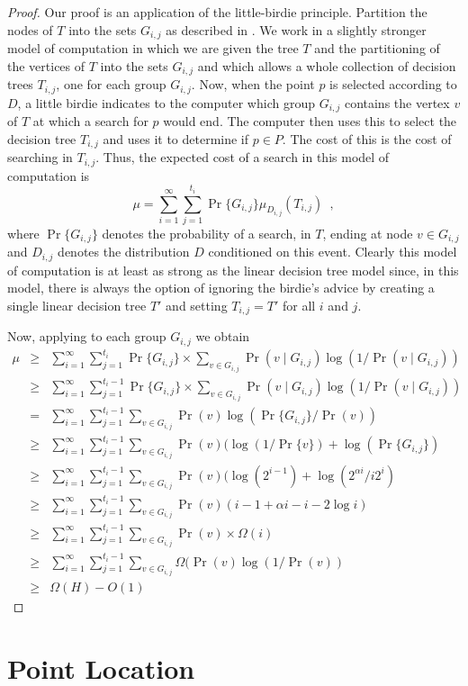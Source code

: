 \documentclass[charterfonts,lotsofwhite]{patmorin}
\begin{document}
\begin{proof}
Our proof is an application of the little-birdie principle.  Partition
the nodes of $T$ into the sets $G_{i,j}$ as described in
.  We work in a slightly stronger model of
computation in which we are given the tree $T$ and the partitioning of
the vertices of $T$ into the sets $G_{i,j}$ and which allows a whole
collection of decision trees $T_{i,j}$, one for each group $G_{i,j}$.
Now, when the point $p$ is selected according to $D$, a little birdie
indicates to the computer which group $G_{i,j}$ contains the vertex
$v$ of $T$ at which a search for $p$ would end.  The computer then
uses this to select the decision tree $T_{i,j}$ and uses it to
determine if $p\in P$.  The cost of this is the cost of searching in
$T_{i,j}$.  Thus, the expected cost of a search 
in this model of computation is
\[
     \mu = \sum_{i=1}^\infty \sum_{j=1}^{t_i}
	\Pr\{G_{i,j}\}\mu_{D_{i,j}}(T_{i,j}) \enspace ,
\]
where $\Pr\{G_{i,j}\}$ denotes the probability of a search, in $T$,
ending at node $v\in G_{i,j}$ and $D_{i,j}$ denotes the distribution
$D$ conditioned on this event.  Clearly this model of computation is
at least as strong as the linear decision tree model since, in this
model, there is always the option of ignoring the birdie's advice by
creating a single linear decision tree $T'$ and setting $T_{i,j}=T'$
for all $i$ and $j$.

Now, applying  to each group $G_{i,j}$ we obtain
\begin{eqnarray*}
\mu & \ge & \sum_{i=1}^{\infty}\sum_{j=1}^{t_i}\Pr\{G_{i,j}\}\times
	\sum_{v\in G_{i,j}}\Pr(v\mid G_{i,j})\log(1/\Pr(v\mid G_{i,j})) \\
& \ge & \sum_{i=1}^{\infty}\sum_{j=1}^{t_i-1}\Pr\{G_{i,j}\}\times
	\sum_{v\in G_{i,j}}\Pr(v\mid G_{i,j})\log(1/\Pr(v\mid G_{i,j})) \\
& = & \sum_{i=1}^{\infty}\sum_{j=1}^{t_i-1}
	\sum_{v\in G_{i,j}}\Pr(v)\log(\Pr\{G_{i,j}\}/\Pr(v)) \\
& \ge & \sum_{i=1}^{\infty}\sum_{j=1}^{t_i-1}
	\sum_{v\in G_{i,j}}\Pr(v)(\log(1/\Pr\{v\})+ \log(\Pr\{G_{i,j}\}) \\
& \ge & \sum_{i=1}^{\infty}\sum_{j=1}^{t_i-1}
	\sum_{v\in G_{i,j}}\Pr(v)(\log(2^{i-1}) + \log(2^{\alpha i}/i2^{i}) \\
& \ge & \sum_{i=1}^{\infty}\sum_{j=1}^{t_i-1}
	\sum_{v\in G_{i,j}}\Pr(v)(i-1 + \alpha i -i -2\log i) \\
& \ge & \sum_{i=1}^{\infty}\sum_{j=1}^{t_i-1}
	\sum_{v\in G_{i,j}}\Pr(v)\times \Omega(i) \\
& \ge & \sum_{i=1}^{\infty}\sum_{j=1}^{t_i-1}
	\sum_{v\in G_{i,j}}\Omega(\Pr(v)\log (1/\Pr(v)) \\
& \ge & \Omega(H) -O(1)
\end{eqnarray*}
\end{proof}

\section{Point Location}
\end{document}
